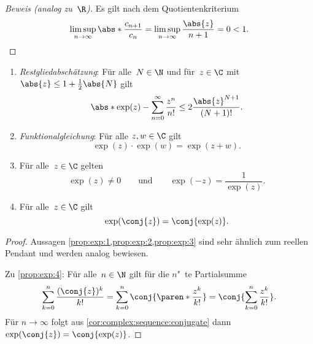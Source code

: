 \documentclass[a4paper]{article}
\begin{document}
\begin{proof}[Beweis (analog zu~$\R$)]
    Es gilt nach dem Quotientenkriterium
    \begin{equation*}
        \limsup_{n\to\infty} \abs*{\frac{c_{n+1}}{c_n}} = \limsup_{n\to\infty} \frac{\abs{z}}{n+1} = 0 < 1. \qedhere
    \end{equation*}
\end{proof}

\begin{proposition}\label{prop:complex:exp:properties}\leavevmode
    \begin{enumerate}
        \item \emph{Restgliedabschätzung}: Für alle~$N \in \N$ und für~$z \in \C$ mit~$\abs{z} \leq 1+\frac{1}{2}\abs{N}$ gilt
              \begin{equation*}
                  \abs*{\exp(z) - \sum_{n=0}^\infty \frac{z^n}{n!}} \leq 2\frac{\abs{z}^{N+1}}{(N+1)!}.
              \end{equation*}\label{prop:exp:1}
        \item \emph{Funktionalgleichung}: Für alle $z, w \in \C$ gilt
              \begin{equation*}
                  \exp(z) \cdot \exp(w) = \exp(z+w).
              \end{equation*}\label{prop:exp:2}
        \item Für alle~$z \in \C$ gelten
              \begin{equation*}
                  \exp(z) \neq 0 \qquad\text{und}\qquad \exp(-z) = \frac{1}{\exp(z)}.
              \end{equation*}\label{prop:exp:3}
        \item Für alle~$z \in \C$ gilt
              \begin{equation*}
                  \exp(\conj{z}) = \conj{\exp(z)}.
              \end{equation*}\label{prop:exp:4}
    \end{enumerate}
\end{proposition}

\begin{proof}
    Aussagen \cref{prop:exp:1,prop:exp:2,prop:exp:3} sind sehr ähnlich zum reellen Pendant und werden analog bewiesen.

    Zu \cref{prop:exp:4}: Für alle~$n \in \N$ gilt für die $n$"~te Partialsumme
    \begin{equation*}
        \sum_{k=0}^n \frac{(\conj{z})^k}{k!} = \sum_{k=0}^n \conj{\paren*{\frac{z^k}{k!}}} = \conj{\sum_{k=0}^n \frac{z^k}{k!}}.
    \end{equation*}
    Für $n \to \infty$ folgt aus \cref{cor:complex:sequence:conjugate} dann $\exp(\conj{z}) = \conj{\exp(z)}$.
\end{proof}
\end{document}
